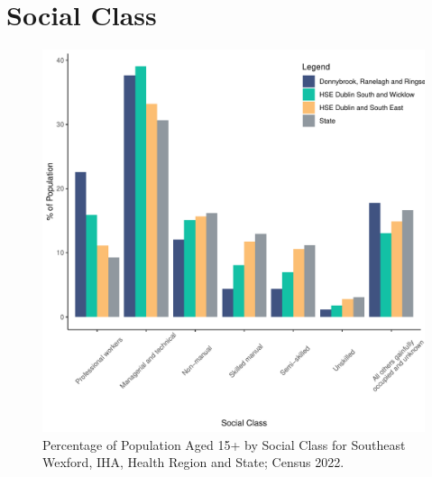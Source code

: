 \documentclass{article}
\begin{document}
\section{Social Class}\label{sect:SC}
\begin{figure}[H]
	\centering
	\includegraphics[width = 140mm]{../figures/SocialClassED.pdf}
	\caption{Percentage of Population Aged 15+ by Social Class for Southeast Wexford, IHA, Health Region and State; Census 2022.}
	\label{fig:vbnv}
	\end{figure}
\end{document}
